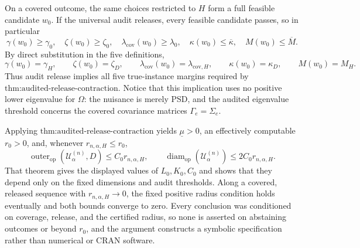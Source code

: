 On a covered outcome, the same choices restricted to \(H\) form a full feasible candidate \(w_0\). If the universal audit releases, every feasible candidate passes, so in particular
\[
\gamma(w_0)\geq\gamma_0,
\quad
\zeta(w_0)\geq\zeta_0,
\quad
\lambda_{\mathrm{cov}}(w_0)\geq\lambda_0,
\quad
\kappa(w_0)\leq\overline\kappa,
\quad
M(w_0)\leq\overline M.
\]
By direct substitution in the five definitions,
\[
\gamma(w_0)=\gamma_H,
\qquad
\zeta(w_0)=\zeta_D,
\qquad
\lambda_{\mathrm{cov}}(w_0)=\lambda_{\mathrm{cov},H},
\qquad
\kappa(w_0)=\kappa_D,
\qquad
M(w_0)=M_H.
\]
Thus audit release implies all five true-instance margins required by \(\text{thm:audited-release-contraction}\). Notice that this implication uses no positive lower eigenvalue for \(\Omega\): the nuisance is merely PSD, and the audited eigenvalue threshold concerns the covered covariance matrices \(\Gamma_e=\Sigma_e\).

Applying \(\text{thm:audited-release-contraction}\) yields \(\underline\mu>0\), an effectively computable \(r_0>0\), and, whenever \(r_{n,\alpha,H}\leq r_0\),
\[
\operatorname{outer}_{\mathrm{op}}(\mathcal U^{(n)}_\alpha,D)
\leq C_0r_{n,\alpha,H},
\qquad
\operatorname{diam}_{\mathrm{op}}(\mathcal U^{(n)}_\alpha)
\leq2C_0r_{n,\alpha,H}.
\]
That theorem gives the displayed values of \(L_0,K_0,C_0\) and shows that they depend only on the fixed dimensions and audit thresholds. Along a covered, released sequence with \(r_{n,\alpha,H}\to0\), the fixed positive radius condition holds eventually and both bounds converge to zero. Every conclusion was conditioned on coverage, release, and the certified radius, so none is asserted on abstaining outcomes or beyond \(r_0\), and the argument constructs a symbolic specification rather than numerical or CRAN software.